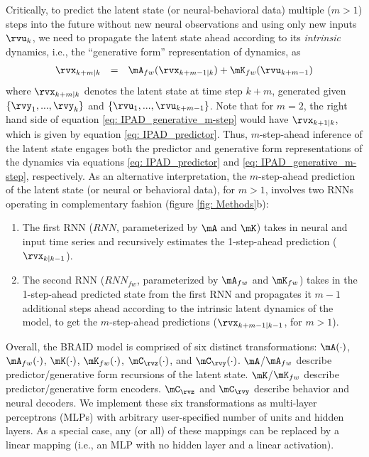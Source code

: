 \documentclass{article} %
\newcommand{\RNN}[1]{\(\textit{RNN#1}\)} %
\newcommand{\RNNfw}[1]{\(\textit{RNN#1}_{fw}\)}
\newcommand{\ourmethod}{BRAID}
\newcommand{\uk}{\(\rvu_{k}\)}
\begin{document}
Critically, to predict the latent state (or neural-behavioral data) multiple (\(m > 1\)) steps into the future without new neural observations and using only new inputs \uk, we need to propagate the latent state ahead according to its \textit{intrinsic} dynamics, i.e., the ``generative form'' representation of dynamics, as
\begin{equation}\label{eq: IPAD_generative_m-step}
    \begin{array}{ccl}
    \rvx_{k+m|k} &=& \mA_{fw}(\rvx_{k+m-1|k}) + \mK_{fw}(\rvu_{k+m-1})
    \end{array}
\end{equation}
where \(\rvx_{k+m|k}\) denotes the latent state at time step \(k+m\), generated given \(\{\rvy_{1}, ... , \rvy_{k}\}\) and \(\{\rvu_{1}, ... , \rvu_{k+m-1}\}\). Note that for \(m\!=\!2\), the right hand side of equation \ref{eq: IPAD_generative_m-step} would have \(\rvx_{k+1|k}\), which is given by equation \ref{eq: IPAD_predictor}. Thus, \(m\)-step-ahead inference of the latent state engages both the predictor and generative form representations of the dynamics via equations \ref{eq: IPAD_predictor} and \ref{eq: IPAD_generative_m-step}, respectively. As an alternative interpretation, the \(m\)-step-ahead prediction of the latent state (or neural or behavioral data), for \(m > 1\), involves two RNNs operating in complementary fashion (figure \ref{fig: Methods}b):
\begin{enumerate}[leftmargin=*]
    \item The first RNN (\RNN{}, parameterized by \(\mA\) and \(\mK\)) takes in neural and input time series and recursively estimates the 1-step-ahead prediction (\(\rvx_{k|k-1}\)).
    \item The second RNN (\RNNfw{}, parameterized by \(\mA_{fw}\) and \(\mK_{fw}\)) takes in the 1-step-ahead predicted state from the first RNN and propagates it \(m-1\) additional steps ahead according to the intrinsic latent dynamics of the model, to get the \(m\)-step-ahead predictions (\(\rvx_{k+m-1|k-1}\), for \(m>1\)).
\end{enumerate}

Overall, the \ourmethod{} model is comprised of six distinct transformations: \(\mA(\cdot)\), \(\mA_{fw}(\cdot)\), \(\mK(\cdot)\), \(\mK_{fw}(\cdot)\), \(\mC_{\rvz}(\cdot)\), and \(\mC_{\rvy}(\cdot)\). \(\mA\)/\(\mA_{fw}\) describe predictor/generative form recursions of the latent state. \(\mK\)/\(\mK_{fw}\) describe predictor/generative form encoders. \(\mC_{\rvz}\) and \(\mC_{\rvy}\) describe behavior and neural decoders. We implement these six transformations as multi-layer perceptrons (MLPs) with arbitrary user-specified number of units and hidden layers. As a special case, any (or all) of these mappings can be replaced by a linear mapping (i.e., an MLP with no hidden layer and a linear activation). 
\end{document}
